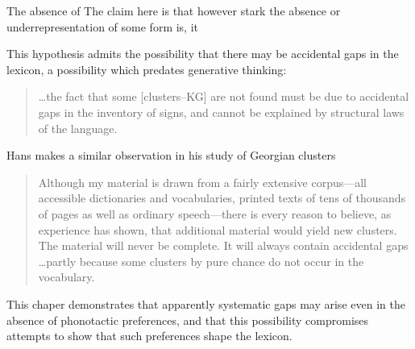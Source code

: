The absence of 
The claim here is that however stark the absence or underrepresentation of some form is, it 

This hypothesis admits the possibility that there may be accidental gaps in the lexicon, a possibility which predates generative thinking:

\begin{quotation}
\ldots the fact that some [clusters--KG] are not found must be due to accidental gaps in the inventory of signs, and cannot be explained by structural laws of the language. \citep[][16]{Fischer-Jorgensen1952}
\end{quotation}

\noindent
Hans \citeauthor{Vogt1954} makes a similar observation in his study of Georgian clusters

\begin{quotation}
Although my material is drawn from a fairly extensive corpus---all accessible dictionaries and vocabularies, printed texts of tens of thousands of pages as well as ordinary speech---there is every reason to believe, as experience has shown, that additional material would yield new clusters. The material will never be complete. It will always contain accidental gaps \ldots partly because some clusters by pure chance do not occur in the vocabulary. \citep[][30]{Vogt1954}
\end{quotation}

\citet{Chomsky1965}

This chaper demonstrates that apparently systematic gaps may arise even in the absence of phonotactic preferences, and that this possibility compromises attempts to show that such preferences shape the lexicon. 
